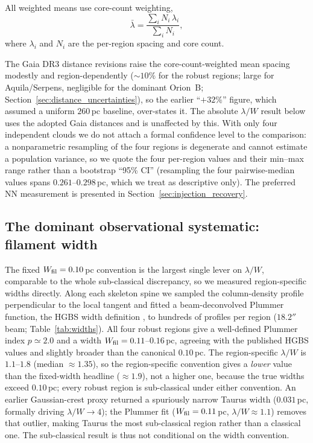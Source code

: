 \documentclass[usenatbib,twoside,twocolumn]{mnras}
\begin{document}
All weighted means use core-count weighting,
\begin{equation}
\bar{\lambda} = \frac{\sum_i N_i\,\lambda_i}{\sum_i N_i},
\label{eq:weighting}
\end{equation}
where $\lambda_i$ and $N_i$ are the per-region spacing and core count.

The Gaia DR3 distance revisions raise the core-count-weighted mean spacing modestly and region-dependently ($\sim10\%$ for the robust regions; large for Aquila/Serpens, negligible for the dominant Orion~B; Section~\ref{sec:distance_uncertainties}), so the earlier ``$+32\%$'' figure, which assumed a uniform $260$\,pc baseline, over-states it. The absolute $\lambda/W$ result below uses the adopted Gaia distances and is unaffected by this. With only four independent clouds we do not attach a formal confidence level to the comparison: a nonparametric resampling of the four regions is degenerate and cannot estimate a population variance, so we quote the four per-region values and their min--max range rather than a bootstrap ``95\% CI'' (resampling the four pairwise-median values spans $0.261$--$0.298$\,pc, which we treat as descriptive only). The preferred NN measurement is presented in Section~\ref{sec:injection_recovery}.

\subsection{The dominant observational systematic: filament width}
\label{sec:widths}

The fixed $W_{\rm fil}=0.10$\,pc convention is the largest single lever on $\lambda/W$, comparable to the whole sub-classical discrepancy, so we measured region-specific widths directly. Along each skeleton spine we sampled the column-density profile perpendicular to the local tangent and fitted a beam-deconvolved Plummer function, the HGBS width definition \citep{Arzoumanian2019}, to hundreds of profiles per region ($18.2''$ beam; Table~\ref{tab:widths}). All four robust regions give a well-defined Plummer index $p\simeq2.0$ and a width $W_{\rm fil}=0.11$--$0.16$\,pc, agreeing with the published HGBS values \citep{Arzoumanian2019} and slightly broader than the canonical $0.10$\,pc. The region-specific $\lambda/W$ is $1.1$--$1.8$ (median $\approx1.35$), so the region-specific convention gives a \emph{lower} value than the fixed-width headline ($\approx1.9$), not a higher one, because the true widths exceed $0.10$\,pc; every robust region is sub-classical under either convention. An earlier Gaussian-crest proxy returned a spuriously narrow Taurus width ($0.031$\,pc, formally driving $\lambda/W\to4$); the Plummer fit ($W_{\rm fil}=0.11$\,pc, $\lambda/W\approx1.1$) removes that outlier, making Taurus the most sub-classical region rather than a classical one. The sub-classical result is thus not conditional on the width convention.
\end{document}
